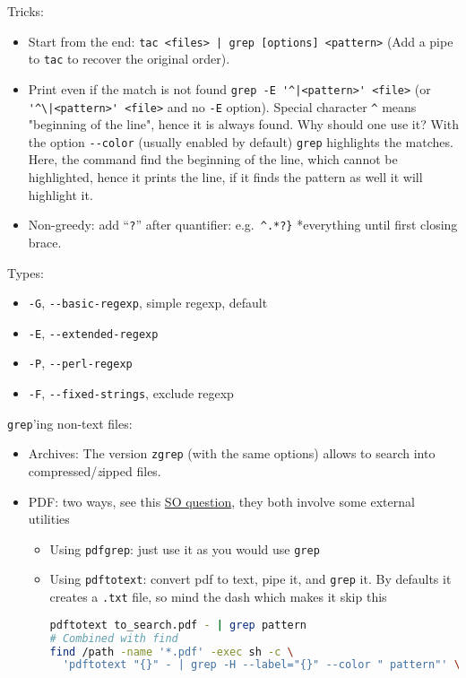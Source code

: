\documentclass[a4paper,12pt,%
              final%
              ]{article}
\begin{document}
Tricks:
\begin{itemize}
  \item Start from the end: \verb!tac <files> | grep [options] <pattern>! (Add a pipe to \texttt{tac} to recover the original order).
  \item Print even if the match is not found \verb!grep -E '^|<pattern>' <file>! (or \verb!'^\|<pattern>' <file>! and no \verb|-E| option). Special character \verb|^| means "beginning of the line", hence it is always found. Why should one use it? With the option \verb|--color| (usually enabled by default) \verb|grep| highlights the matches. Here, the command find the beginning of the line, which cannot be highlighted, hence it prints the line, if it finds the pattern as well it will highlight it.
  \item Non-greedy: add ``\texttt{?}'' after quantifier: e.g.\ \verb|^.*?}| *everything until first closing brace.
\end{itemize}

Types:
\begin{itemize}
  \item \texttt{-G}, \verb|--basic-regexp|, simple regexp, default
  \item \texttt{-E}, \verb|--extended-regexp|
  \item \texttt{-P}, \verb|--perl-regexp|
  \item \texttt{-F}, \verb|--fixed-strings|, exclude regexp
\end{itemize}

\texttt{grep}'ing non-text files:
\begin{itemize}
  \item Archives: The version \texttt{zgrep} (with the same options) allows to search into compressed/\emph{z}ipped files.
  \item PDF: two ways, see this \href{https://unix.stackexchange.com/questions/6704/how-can-i-grep-in-pdf-files}{SO question}, they both involve some external utilities
    \begin{itemize}
      \item Using \texttt{pdfgrep}: just use it as you would use \texttt{grep}
      \item Using \texttt{pdftotext}: convert pdf to text, pipe it, and \texttt{grep} it. By defaults it creates a \texttt{.txt} file, so mind the dash which makes it skip this
\begin{lstlisting}[language=bash]
pdftotext to_search.pdf - | grep pattern
# Combined with find
find /path -name '*.pdf' -exec sh -c \
  'pdftotext "{}" - | grep -H --label="{}" --color " pattern"' \;
\end{lstlisting}
    \end{itemize}
\end{itemize}
\end{document}

